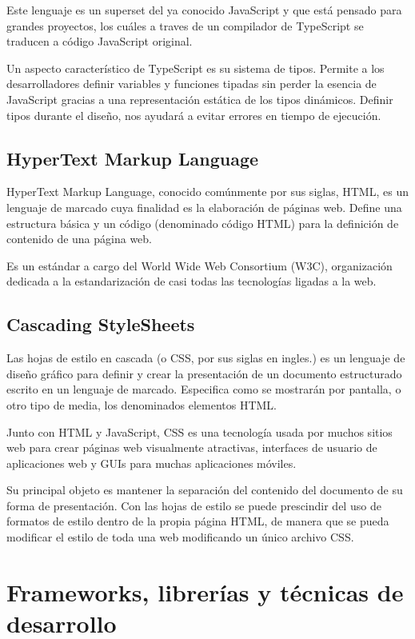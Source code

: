 Este lenguaje es un superset del ya conocido JavaScript y que está pensado para grandes proyectos, los cuáles a traves de un compilador de TypeScript se traducen a código JavaScript original.

Un aspecto característico de TypeScript es su sistema de tipos. Permite a los desarrolladores definir variables y funciones tipadas sin perder la esencia de JavaScript gracias a una representación estática de los tipos dinámicos. Definir tipos durante el diseño, nos ayudará a evitar errores en tiempo de ejecución.

\subsection{HyperText Markup Language}
HyperText Markup Language, conocido comúnmente por sus siglas, HTML, es un lenguaje de marcado cuya finalidad es la elaboración de páginas web. Define una estructura básica y un código (denominado código HTML) para la definición de contenido de una página web. 

Es un estándar a cargo del World Wide Web Consortium (W3C), organización dedicada a la estandarización de casi todas las tecnologías ligadas a la web.

\subsection{Cascading StyleSheets}
Las hojas de estilo en cascada (o CSS, por sus siglas en ingles.) es un lenguaje de diseño gráfico para definir y crear la presentación de un documento estructurado escrito en un lenguaje de marcado. Especifica como se mostrarán por pantalla, o otro tipo de media, los denominados elementos HTML.

Junto con HTML y JavaScript, CSS es una tecnología usada por muchos sitios web para crear páginas web visualmente atractivas, interfaces de usuario de aplicaciones web y GUIs para muchas aplicaciones móviles.

Su principal objeto es mantener la separación del contenido del documento de su forma de presentación. Con las hojas de estilo se puede prescindir del uso de formatos de estilo dentro de la propia página HTML, de manera que se pueda modificar el estilo de toda una web modificando un único archivo CSS.




\section{Frameworks, librerías y técnicas de desarrollo}
